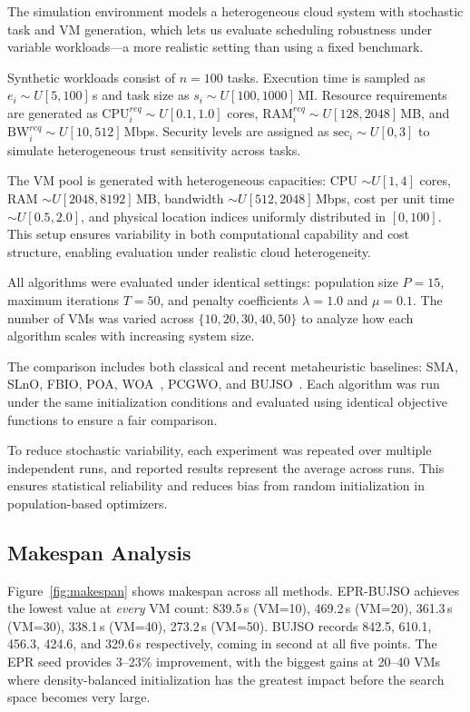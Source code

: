 \documentclass[journal]{IEEEtran}
\begin{document}
The simulation environment models a heterogeneous cloud system with stochastic task and VM generation, which lets us evaluate scheduling robustness under variable workloads---a more realistic setting than using a fixed benchmark.

Synthetic workloads consist of $n=100$ tasks. Execution time is sampled as $e_i \sim U[5,100]$\,s and task size as $s_i \sim U[100,1000]$\,MI. Resource requirements are generated as $\mathrm{CPU}^{req}_i \sim U[0.1,1.0]$ cores, $\mathrm{RAM}^{req}_i \sim U[128,2048]$\,MB, and $\mathrm{BW}^{req}_i \sim U[10,512]$\,Mbps. Security levels are assigned as $\mathrm{sec}_i \sim U[0,3]$ to simulate heterogeneous trust sensitivity across tasks.

The VM pool is generated with heterogeneous capacities: CPU $\sim U[1,4]$ cores, RAM $\sim U[2048,8192]$\,MB, bandwidth $\sim U[512,2048]$\,Mbps, cost per unit time $\sim U[0.5,2.0]$, and physical location indices uniformly distributed in $[0,100]$. This setup ensures variability in both computational capability and cost structure, enabling evaluation under realistic cloud heterogeneity.

All algorithms were evaluated under identical settings: population size $P=15$, maximum iterations $T=50$, and penalty coefficients $\lambda=1.0$ and $\mu=0.1$. The number of VMs was varied across $\{10,20,30,40,50\}$ to analyze how each algorithm scales with increasing system size.

The comparison includes both classical and recent metaheuristic baselines: SMA, SLnO, FBIO, POA, WOA~\cite{chen2020woa}, PCGWO, and BUJSO~\cite{pachipala2024}. Each algorithm was run under the same initialization conditions and evaluated using identical objective functions to ensure a fair comparison.

To reduce stochastic variability, each experiment was repeated over multiple independent runs, and reported results represent the average across runs. This ensures statistical reliability and reduces bias from random initialization in population-based optimizers.

\subsection{Makespan Analysis}

Figure~\ref{fig:makespan} shows makespan across all methods. EPR-BUJSO achieves the lowest value at \emph{every} VM count: 839.5\,s (VM=10), 469.2\,s (VM=20), 361.3\,s (VM=30), 338.1\,s (VM=40), 273.2\,s (VM=50). BUJSO records 842.5, 610.1, 456.3, 424.6, and 329.6\,s respectively, coming in second at all five points. The EPR seed provides 3--23\% improvement, with the biggest gains at 20--40 VMs where density-balanced initialization has the greatest impact before the search space becomes very large.
\end{document}

